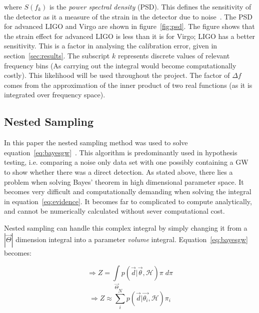\documentclass{jpconf}
\newcommand{\curlH}{\mathcal{H}}
\begin{document}
where $S(f_{k})$ is the \textit{power spectral density} (PSD). This defines the sensitivity of the detector as it a measure of the strain in the detector due to noise~\cite{SathSchutz,sens}. The PSD for advanced LIGO and Virgo are shown in figure~\ref{fig:psd}. The figure shows that the strain effect for advanced LIGO is less than it is for Virgo; LIGO has a better sensitivity. This is a factor in analysing the calibration error, given in section~\ref{sec:results}. The subscript $k$ represents discrete values of relevant frequency bins (As carrying out the integral would become computationally costly). This likelihood will be used throughout the project. The factor of $\Delta f$ comes from the approximation of the inner product of two real functions (as it is integrated over frequency space).










\subsection{Nested Sampling\label{sec:nest}}



In this paper the nested sampling method was used to solve equation~\ref{eq:bayesgw}~\cite{Sivia}. This algorithm is predominantly used in hypothesis testing, i.e. comparing a noise only data set with one possibly containing a GW to show whether there was a direct detection. As stated above, there lies a problem when solving Bayes' theorem in high dimensional parameter space. It becomes very difficult and computationally demanding when solving the integral in equation~\ref{eq:evidence}. It becomes far to complicated to compute analytically, and cannot be numerically calculated without sever computational cost.  

Nested sampling can handle this complex integral by simply changing it from a $|\vec{\Theta}|$ dimension integral into a parameter \textit{volume} integral. Equation~\ref{eq:bayesgw} becomes:

\begin{equation*}
  \Rightarrow Z = \int \limits_{\vec{\Theta}} p(\vec{d}|\vec{\theta}, \mathcal{H}) \pi \;d\pi 
\end{equation*}
\begin{equation*}
  \Rightarrow Z \approx \sum \limits_i^N p(\vec{d}| \vec{\theta_i}, \curlH) \pi_i
\end{equation*}
\end{document}
